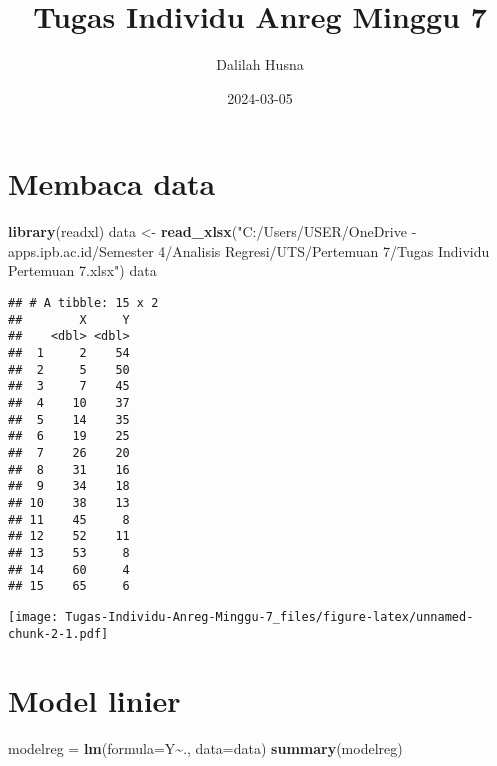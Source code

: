 \documentclass[
]{article}
\title{Tugas Individu Anreg Minggu 7}
\author{Dalilah Husna}
\date{2024-03-05}
\newenvironment{Shaded}{\begin{snugshade}}{\end{snugshade}}
\newcommand{\AttributeTok}[1]{\textcolor[rgb]{0.13,0.29,0.53}{#1}}
\newcommand{\FunctionTok}[1]{\textcolor[rgb]{0.13,0.29,0.53}{\textbf{#1}}}
\newcommand{\NormalTok}[1]{#1}
\newcommand{\OtherTok}[1]{\textcolor[rgb]{0.56,0.35,0.01}{#1}}
\newcommand{\SpecialCharTok}[1]{\textcolor[rgb]{0.81,0.36,0.00}{\textbf{#1}}}
\newcommand{\StringTok}[1]{\textcolor[rgb]{0.31,0.60,0.02}{#1}}
\begin{document}
\maketitle

\hypertarget{membaca-data}{%
\section{Membaca data}\label{membaca-data}}

\begin{Shaded}
\begin{Highlighting}[]
\FunctionTok{library}\NormalTok{(readxl)}
\NormalTok{data }\OtherTok{\textless{}{-}} \FunctionTok{read\_xlsx}\NormalTok{(}\StringTok{"C:/Users/USER/OneDrive {-} apps.ipb.ac.id/Semester 4/Analisis Regresi/UTS/Pertemuan 7/Tugas Individu Pertemuan 7.xlsx"}\NormalTok{)}
\NormalTok{data}
\end{Highlighting}
\end{Shaded}

\begin{verbatim}
## # A tibble: 15 x 2
##        X     Y
##    <dbl> <dbl>
##  1     2    54
##  2     5    50
##  3     7    45
##  4    10    37
##  5    14    35
##  6    19    25
##  7    26    20
##  8    31    16
##  9    34    18
## 10    38    13
## 11    45     8
## 12    52    11
## 13    53     8
## 14    60     4
## 15    65     6
\end{verbatim}

\begin{Shaded}
\end{Shaded}

\texttt{[image: Tugas-Individu-Anreg-Minggu-7\_files/figure-latex/unnamed-chunk-2-1.pdf]}

\hypertarget{model-linier}{%
\section{Model linier}\label{model-linier}}

\begin{Shaded}
\begin{Highlighting}[]
\NormalTok{modelreg }\OtherTok{=} \FunctionTok{lm}\NormalTok{(}\AttributeTok{formula=}\NormalTok{Y}\SpecialCharTok{\textasciitilde{}}\NormalTok{., }\AttributeTok{data=}\NormalTok{data)}
\FunctionTok{summary}\NormalTok{(modelreg)}
\end{Highlighting}
\end{Shaded}
\end{document}
